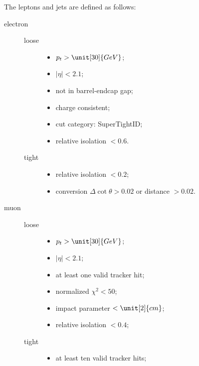 The leptons and jets are defined as follows:
\begin{description}
    \item[electron]
        \begin{description}
            \item[loose]
                \begin{itemize}
                    \item $p_t > \unit[30]{GeV}$;
                    \item $\lvert \eta \rvert < 2.1$;
                    \item not in barrel-endcap gap;
                    \item charge consistent;
                    \item cut category: SuperTightID;
                    \item relative isolation $< 0.6$.
                \end{itemize}
            \item[tight] 
                \begin{itemize}
                    \item relative isolation $< 0.2$;
                    \item conversion $\Delta \cot \theta > 0.02$ or distance $> 0.02$.
                \end{itemize}
        \end{description}
    \item[muon] 
        \begin{description}
            \item[loose]
                \begin{itemize}
                    \item $p_t > \unit[30]{GeV}$;
                    \item $\lvert \eta \rvert < 2.1$;
                    \item at least one valid tracker hit;
                    \item normalized $\chi^2 < 50$;
                    \item impact parameter $< \unit[2]{cm}$;
                    \item relative isolation $< 0.4$;
                \end{itemize}
            \item[tight] 
                \begin{itemize}
                    \item at least ten valid tracker hits;

\end{itemize}
\end{description}
\end{description}
